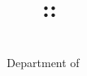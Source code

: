

\title{\textbf{\Huge{\topicSubTitle\ :: \topicTitle}\vspace{0.3cm}\\ \Large{\adfhangingflatleafleft\quad\docType\quad\adfhangingflatleafright}\vspace{0.6cm}}}
\author{\Large{\authorName}\\ \large{Department of \authorDepartment}\\ \large{\authorAffiliation}}
\date{}